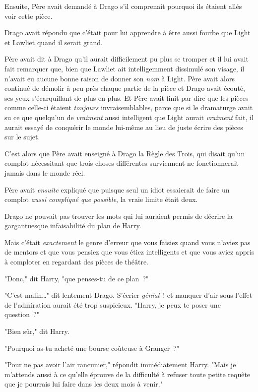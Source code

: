 Ensuite, Père avait demandé à Drago s'il comprenait pourquoi ils étaient allés voir cette pièce.

Drago avait répondu que c'était pour lui apprendre à être aussi fourbe que Light et Lawliet quand il serait grand.

Père avait dit à Drago qu'il aurait difficilement pu plus se tromper et il lui avait fait remarquer que, bien que Lawliet ait intelligemment dissimulé son visage, il n'avait eu aucune bonne raison de donner son \emph{nom} à Light. Père avait alors continué de démolir à peu près chaque partie de la pièce et Drago avait écouté, ses yeux s'écarquillant de plus en plus. Et Père avait finit par dire que les pièces comme celle-ci étaient \emph{toujours} invraisemblables, parce que si le dramaturge avait su ce que quelqu'un de \emph{vraiment} aussi intelligent que Light aurait \emph{vraiment} fait, il aurait essayé de conquérir le monde lui-même au lieu de juste écrire des pièces sur le sujet.

C'est alors que Père avait enseigné à Drago la Règle des Trois, qui disait qu'un complot nécessitant que trois choses différentes surviennent ne fonctionnerait jamais dans le monde réel.

Père avait \emph{ensuite} expliqué que puisque seul un idiot essaierait de faire un complot \emph{aussi compliqué que possible}, la vraie limite était deux.

Drago ne pouvait pas trouver les mots qui lui auraient permis de décrire la gargantuesque infaisabilité du plan de Harry.

Mais c'était \emph{exactement} le genre d'erreur que vous faisiez quand vous n'aviez pas de mentors et que vous pensiez que vous étiez intelligents et que vous aviez appris à comploter en regardant des pièces de théâtre.

"Donc," dit Harry, "que penses-tu de ce plan~?"

"C'est malin…" dit lentement Drago. S'écrier \emph{génial}~! et manquer d'air sous l'effet de l'admiration aurait été trop suspicieux. "Harry, je peux te poser une question~?"

"Bien sûr," dit Harry.

"Pourquoi as-tu acheté une bourse coûteuse à Granger~?"

"Pour ne pas avoir l'air rancunier," répondit immédiatement Harry. "Mais je m'attends aussi à ce qu'elle éprouve de la difficulté à refuser toute petite requête que je pourrais lui faire dans les deux mois à venir."

